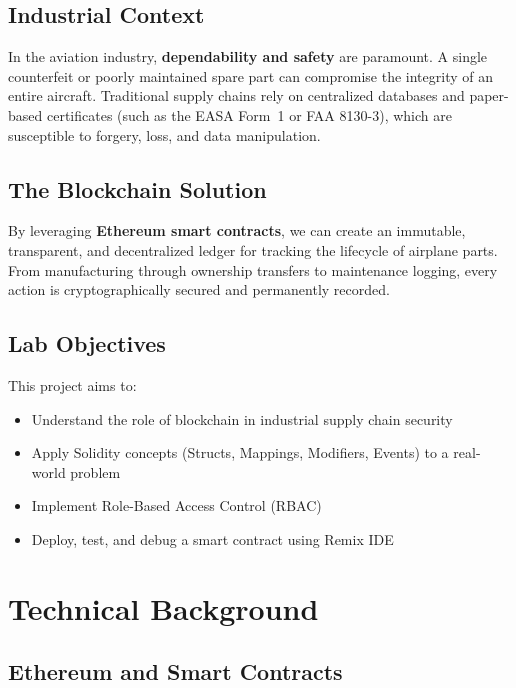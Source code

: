 \documentclass[12pt,a4paper]{article}
\begin{document}
\subsection{Industrial Context}

In the aviation industry, \textbf{dependability and safety} are paramount. A single counterfeit or poorly maintained spare part can compromise the integrity of an entire aircraft. Traditional supply chains rely on centralized databases and paper-based certificates (such as the EASA Form~1 or FAA 8130-3), which are susceptible to forgery, loss, and data manipulation.

\subsection{The Blockchain Solution}

By leveraging \textbf{Ethereum smart contracts}, we can create an immutable, transparent, and decentralized ledger for tracking the lifecycle of airplane parts. From manufacturing through ownership transfers to maintenance logging, every action is cryptographically secured and permanently recorded.

\subsection{Lab Objectives}

This project aims to:
\begin{itemize}
    \item Understand the role of blockchain in industrial supply chain security
    \item Apply Solidity concepts (Structs, Mappings, Modifiers, Events) to a real-world problem
    \item Implement Role-Based Access Control (RBAC)
    \item Deploy, test, and debug a smart contract using Remix IDE
\end{itemize}

\section{Technical Background}

\subsection{Ethereum and Smart Contracts}
\end{document}
